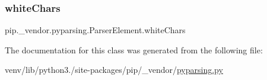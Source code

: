 \mbox{\label{classpip_1_1__vendor_1_1pyparsing_1_1ParserElement_abf8bd0cea2cc671aea186f2cd6860bc5}} 
\subsubsection{\texorpdfstring{white\+Chars}{whiteChars}}
{\footnotesize\ttfamily pip.\+\_\+vendor.\+pyparsing.\+Parser\+Element.\+white\+Chars}



The documentation for this class was generated from the following file\+:\begin{DoxyCompactItemize}
\item 
venv/lib/python3./site-\/packages/pip/\+\_\+vendor/\hyperlink{pip_2__vendor_2pyparsing_8py}{pyparsing.\+py}\end{DoxyCompactItemize}
